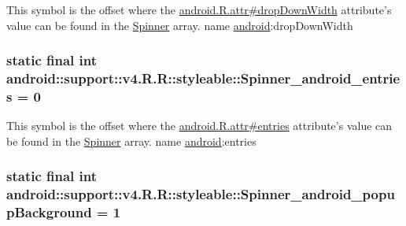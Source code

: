 This symbol is the offset where the \hyperlink{}{android.R.attr\#dropDownWidth} attribute's value can be found in the \hyperlink{classandroid_1_1support_1_1v4_1_1_r_1_1styleable_7b6b9d4f9b35dbabe5f917505d63c414}{Spinner} array.  name \hyperlink{namespaceandroid}{android}:dropDownWidth \hypertarget{classandroid_1_1support_1_1v4_1_1_r_1_1styleable_e1857fbb0172a2ba1e3b518c6dacac0d}{
\subsubsection[{Spinner\_\-android\_\-entries}]{\setlength{\rightskip}{0pt plus 5cm}static final int android::support::v4.R.R::styleable::Spinner\_\-android\_\-entries = 0}}
\label{classandroid_1_1support_1_1v4_1_1_r_1_1styleable_e1857fbb0172a2ba1e3b518c6dacac0d}


This symbol is the offset where the \hyperlink{}{android.R.attr\#entries} attribute's value can be found in the \hyperlink{classandroid_1_1support_1_1v4_1_1_r_1_1styleable_7b6b9d4f9b35dbabe5f917505d63c414}{Spinner} array.  name \hyperlink{namespaceandroid}{android}:entries \hypertarget{classandroid_1_1support_1_1v4_1_1_r_1_1styleable_101054d5ddcc269aa79631d35504d107}{
\subsubsection[{Spinner\_\-android\_\-popupBackground}]{\setlength{\rightskip}{0pt plus 5cm}static final int android::support::v4.R.R::styleable::Spinner\_\-android\_\-popupBackground = 1}}
\label{classandroid_1_1support_1_1v4_1_1_r_1_1styleable_101054d5ddcc269aa79631d35504d107}


